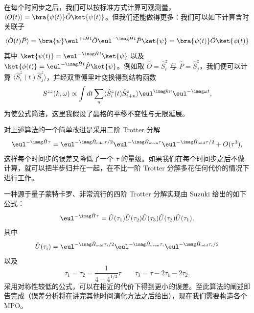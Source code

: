 在每个时间步之后，我们可以按标准方式计算可观测量，$\langle O(t) \rangle = \bra{\psi(t)} \hat{O} \ket{\psi(t)}$。但我们还能做得更多：我们可以如下计算含时关联子
\begin{equation}
\langle \hat{O}(t) \hat{P} \rangle = \bra{\psi} \eul^{+i\hat{H}t} \hat{O} \eul^{-\imag \hat{H}t} \hat{P} \ket{\psi}
= \bra{\psi(t)} \hat{O} \ket{\phi(t)}
\end{equation}
其中 $\ket{\psi(t)} = \eul^{-\imag \hat{H}t}\ket{\psi}$ 以及 $\ket{\phi(t)} = \eul^{-\imag \hat{H}t} \hat{P} \ket{\psi}$。例如取 $\hat{O} = \hat{S}^z_i$ 与 $\hat{P} = \hat{S}^z_j$，我们便可以计算 
$\langle \hat{S}^z_i(t) \hat{S}^z_j \rangle$，并经双重傅里叶变换得到结构函数
\begin{equation}
S^{zz}(k,\omega) \propto \int dt \sum_{n} \langle \hat{S}^z_i(t) \hat{S}^z_{i+n} \rangle \eul^{\imag kn}\eul^{-\imag \omega t},
\end{equation}
为使公式简洁，这里我假设了晶格的平移不变性与无限延展。

对上述算法的一个简单改进是采用二阶 Trotter 分解
\begin{equation}
\eul^{-\imag  \hat{H}\tau} = \eul^{-\imag  \hat{H}_{{\rm odd}} \tau/2}\eul^{-\imag  \hat{H}_{{\rm even}} \tau}\eul^{-\imag  \hat{H}_{{\rm odd}} \tau/2} + O(\tau^3),
\end{equation}
这样每个时间步的误差又降低了一个 $\tau$ 的量级。如果我们在每个时间步之后不做计算，就可以把半步归并在一起，在不比一阶 Trotter 分解多花任何代价的情况下进行工作。

一种源于量子蒙特卡罗、非常流行的四阶 Trotter 分解实现由 Suzuki\cite{Suzuki76,Suzuki91} 给出的如下公式：
\begin{equation}
\eul^{-\imag  \hat{H}\tau} = \hat{U}(\tau_1) \hat{U}(\tau_2) \hat{U}(\tau_3) \hat{U}(\tau_2) \hat{U}(\tau_1),  
\end{equation}
其中
\begin{equation}
\hat{U} (\tau_i) = \eul^{-\imag  \hat{H}_{{\rm odd}} \tau_i/2}\eul^{-\imag  \hat{H}_{{\rm even}} \tau_i}\eul^{-\imag  \hat{H}_{{\rm odd}}
\tau_i/2}
\end{equation}
以及
\begin{equation}
\tau_1 = \tau_2 = \frac{1}{4-4^{1/3}} \tau  \quad\quad \tau_3 = \tau -2 \tau_1 - 2\tau_2 .
\end{equation}
采用对称性较低的公式\cite{McLachlan95}，可以在相近的代价下得到更小的误差。至此算法的阐述即告完成（误差分析将在讲完其他时间演化方法之后给出），现在我们需要构造各个 MPO。

